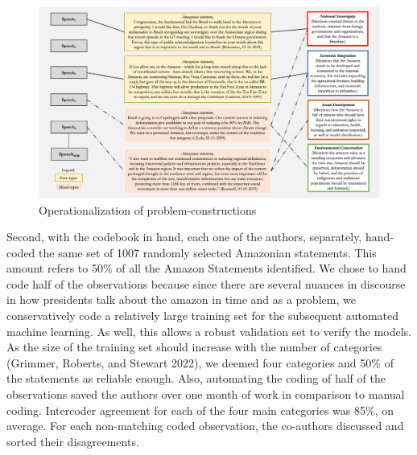 \documentclass[
]{article}
\begin{document}
\begin{landscape}

\begin{figure}
\includegraphics[width=1\linewidth]{figure1pic} \caption{Operationalization of problem-constructions}\label{fig:figure1}
\end{figure}

\end{landscape}

Second, with the codebook in hand, each one of the authors, separately,
hand-coded the same set of 1007 randomly selected Amazonian statements.
This amount refers to 50\% of all the Amazon Statements identified. We
chose to hand code half of the observations because since there are
several nuances in discourse in how presidents talk about the amazon in
time and as a problem, we conservatively code a relatively large
training set for the subsequent automated machine learning. As well,
this allows a robust validation set to verify the models. As the size of
the training set should increase with the number of categories (Grimmer,
Roberts, and Stewart 2022), we deemed four categories and 50\% of the
statements as reliable enough. Also, automating the coding of half of
the observations saved the authors over one month of work in comparison
to manual coding. Intercoder agreement for each of the four main
categories was 85\%, on average. For each non-matching coded
observation, the co-authors discussed and sorted their disagreements.
\end{document}
